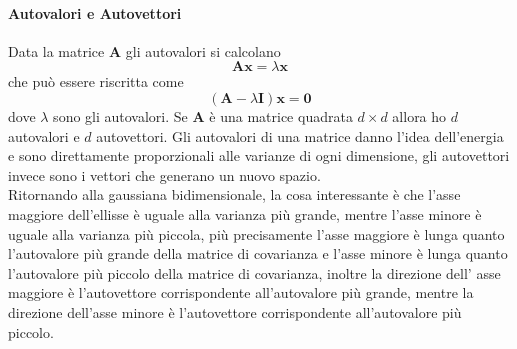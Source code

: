 \paragraph{Autovalori e Autovettori}
Data la matrice $\mathbf{A}$ gli autovalori si calcolano 
\begin{equation}
\mathbf{A} \mathbf{x} = \lambda \mathbf{x}
\end{equation}
che può essere riscritta come
\begin{equation}
(\mathbf{A} - \lambda \mathbf{I})\mathbf{x} = \mathbf{0}
\end{equation}
dove $\lambda$ sono gli autovalori. Se $\mathbf{A}$ è una matrice quadrata $d \times d$ allora ho $d$ autovalori e $d$ autovettori. Gli autovalori di una matrice danno l'idea dell'energia e sono direttamente proporzionali alle varianze di ogni dimensione, gli autovettori invece sono i vettori che generano un nuovo spazio.\\

\noindent Ritornando alla gaussiana bidimensionale, la cosa interessante è che l'asse maggiore dell'ellisse è uguale alla varianza più grande, mentre l'asse minore è uguale alla varianza più piccola, più precisamente l'asse maggiore è lunga quanto l'autovalore più grande della matrice di covarianza e l'asse minore è lunga quanto l'autovalore più piccolo della matrice di covarianza, inoltre la direzione dell' asse maggiore è l'autovettore corrispondente all'autovalore più grande, mentre la direzione dell'asse minore è l'autovettore corrispondente all'autovalore più piccolo. 

